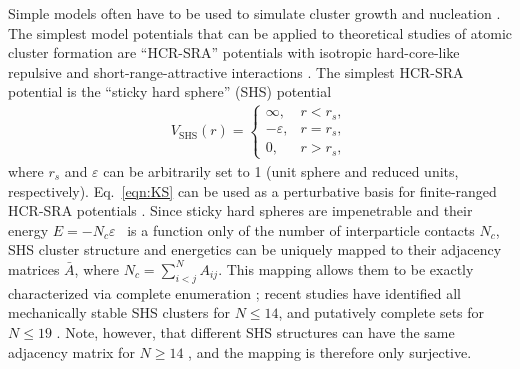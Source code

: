 Simple models often have to be used to simulate cluster growth and nucleation
\autocite{Johnston-1999, Shibuta_Homogeneousnucleationmicrostructure_2015,
Leitold-2016, Sweatman-2016}.  The simplest model potentials that can be
applied to theoretical studies of atomic cluster formation are ``HCR-SRA''
potentials with isotropic hard-core-like repulsive and short-range-attractive
interactions \autocite{baxter68}.  The simplest HCR-SRA potential is the
``sticky hard sphere'' (SHS) potential \autocite{Yuste_Stickyhardspheres_1993}
\begin{align}
    V_\mathrm{SHS}(r)=\begin{cases}
        \infty, & r < r_s,\\
        -\varepsilon, & r = r_s,\\
        0, & r > r_s,
    \end{cases}
\label{eqn:KS}
\end{align}
where $r_s$ and $\varepsilon$ can be arbitrarily set to 1 (unit sphere and
reduced units, respectively).  Eq.~\ref{eqn:KS} can be used as a perturbative
basis for finite-ranged HCR-SRA potentials \autocite{cochran06,
Holmes-Cerfon_geometricalapproachcomputing_2013}.  Since sticky hard spheres
are impenetrable and their energy $E = -N_c\varepsilon$ ~is a function only of
the number of interparticle contacts $N_c$, SHS cluster structure and
energetics can be uniquely mapped to their adjacency matrices $\bar{A}$, where
$N_c=\sum_{i<j}^N A_{ij}$.  This mapping allows them to be exactly
characterized via complete enumeration
\autocite{Arkus_Minimalenergyclusters_2009, Arkus_DerivingFiniteSphere_2011,
Hoy_Structurefinitesphere_2012}; recent studies have identified all
mechanically stable SHS clusters for $N \leq 14$, and putatively complete sets
for $N \leq 19$ \autocite{Arkus_Minimalenergyclusters_2009,
Arkus_DerivingFiniteSphere_2011, Hoy_Structurefinitesphere_2012,
Hoy_Structuredynamicsmodel_2015, Holmes-Cerfon_StickySphereClusters_2017,
Kallus_Freeenergysingular_2017}.  Note, however, that different SHS structures
can have the same adjacency matrix for $N \geq 14$
\autocite{Holmes-Cerfon_EnumeratingRigidSphere_2016}, and the mapping is
therefore only surjective.

